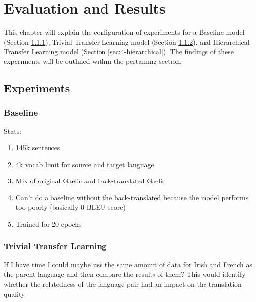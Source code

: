 
\chapter{Evaluation and Results}
This chapter will explain the configuration of experiments for a Baseline model (Section \ref{sec:4-baseline}), Trivial Transfer Learning model (Section \ref{sec:4-trivial}), and Hierarchical Transfer Learning model (Section \ref{sec:4-hierarchical}). The findings of these experiments will be outlined within the pertaining section.
\newpage

\section{Experiments}

\subsection{Baseline}
\label{sec:4-baseline}
Stats:
\begin{enumerate}
    \item 145k sentences
    \item 4k vocab limit for source and target language
    \item Mix of original Gaelic and back-translated Gaelic
    \item Can't do a baseline without the back-translated because the model performs too poorly (basically 0 BLEU score)
    \item Trained for 20 epochs
\end{enumerate}




\subsection{Trivial Transfer Learning}
\label{sec:4-trivial}

If I have time I could maybe use the same amount of data for Irish and French as the parent language and then compare the results of them? This would identify whether the relatedness of the language pair had an impact on the translation quality

